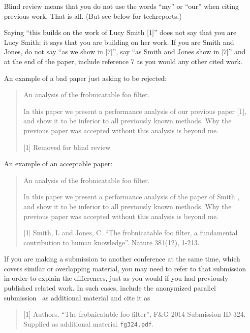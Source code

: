 \documentclass[10pt,twocolumn,letterpaper]{article}
\begin{document}
Blind review means that you do not use the words ``my'' or ``our''
when citing previous work.  That is all.  (But see below for
techreports.)

Saying ``this builds on the work of Lucy Smith [1]'' does not say
that you are Lucy Smith; it says that you are building on her
work.  If you are Smith and Jones, do not say ``as we show in
[7]'', say ``as Smith and Jones show in [7]'' and at the end of the
paper, include reference 7 as you would any other cited work.

An example of a bad paper just asking to be rejected:
\begin{quote}
\begin{center}
    An analysis of the frobnicatable foo filter.
\end{center}

   In this paper we present a performance analysis of our
   previous paper [1], and show it to be inferior to all
   previously known methods.  Why the previous paper was
   accepted without this analysis is beyond me.

   [1] Removed for blind review
\end{quote}


An example of an acceptable paper:

\begin{quote}
\begin{center}
     An analysis of the frobnicatable foo filter.
\end{center}

   In this paper we present a performance analysis of the
   paper of Smith \etal [1], and show it to be inferior to
   all previously known methods.  Why the previous paper
   was accepted without this analysis is beyond me.

   [1] Smith, L and Jones, C. ``The frobnicatable foo
   filter, a fundamental contribution to human knowledge''.
   Nature 381(12), 1-213.
\end{quote}

If you are making a submission to another conference at the same time,
which covers similar or overlapping material, you may need to refer to that
submission in order to explain the differences, just as you would if you
had previously published related work.  In such cases, include the
anonymized parallel submission~\cite{Authors14} as additional material and
cite it as
\begin{quote}
[1] Authors. ``The frobnicatable foo filter'', F\&G 2014 Submission ID 324,
Supplied as additional material {\tt fg324.pdf}.
\end{quote}
\end{document}
